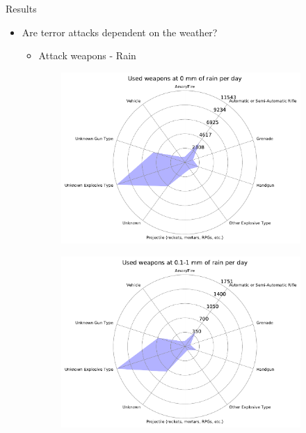 \documentclass{beamer}
\begin{document}
\begin{frame}{Results}
	\begin{itemize}
		\item 
		Are terror attacks dependent on the weather?
		\begin{itemize}
			\item Attack weapons - Rain
		\end{itemize}
	\end{itemize}
	
	\begin{figure}
		\begin{subfigure}[b]{0.3\textwidth}
			\includegraphics[width=\textwidth]{Rain-Weapon/rain0_starDiagram}
		\end{subfigure}
		\begin{subfigure}[b]{0.3\textwidth}
			\includegraphics[width=\textwidth]{Rain-Weapon/rain01-1_starDiagram}

\end{subfigure}
\end{figure}
\end{frame}
\end{document}

